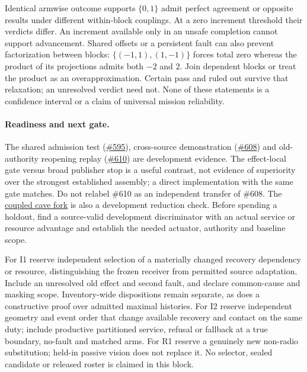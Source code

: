 \documentclass{article}
\begin{document}
Identical armwise outcome supports \(\{0,1\}\) admit perfect agreement or
opposite results under different within-block couplings. At a zero
increment threshold their verdicts differ. An increment available only in
an unsafe completion cannot support advancement. Shared offsets or a
persistent fault can also prevent factorization between blocks:
\(\{(-1,1),(1,-1)\}\) forces total zero whereas the product of its
projections admits both \(-2\) and \(2\). Join dependent blocks or treat
the product as an overapproximation. Certain pass and ruled out survive
that relaxation; an unresolved verdict need not. None of these statements
is a confidence interval or a claim of universal mission reliability.

\paragraph{Readiness and next gate.}
The shared admission test
(\href{https://github.com/eternal-november/eos-research-programmes/pull/595}{\#595}),
cross-source demonstration
(\href{https://github.com/eternal-november/eos-research-programmes/pull/608}{\#608})
and old-authority reopening replay
(\href{https://github.com/eternal-november/eos-research-programmes/pull/610}{\#610})
are development evidence. The effect-local gate versus broad publisher
stop is a useful contrast, not evidence of superiority over the strongest
established assembly; a direct implementation with the same gate matches.
Do not relabel \#610 as an independent transfer of \#608. The
\href{https://github.com/eternal-november/eos-research-programmes/pull/600}{coupled cave fork}
is also a development reduction check. Before spending a holdout, find a
source-valid development discriminator with an actual service or resource
advantage and establish the needed actuator, authority and baseline scope.

For I1 reserve independent selection of a materially changed recovery
dependency or resource, distinguishing the frozen receiver from permitted
source adaptation. Include an unresolved old effect and second fault,
and declare common-cause and masking scope. Inventory-wide dispositions
remain separate, as does a constructive proof over admitted maximal
histories. For I2 reserve independent geometry and event order that change
available recovery and contact on the same duty; include productive
partitioned service, refusal or fallback at a true boundary, no-fault
and matched arms. For R1 reserve a genuinely new non-radio substitution;
held-in passive vision does not replace it. No selector, sealed candidate
or released roster is claimed in this block.
\end{document}

